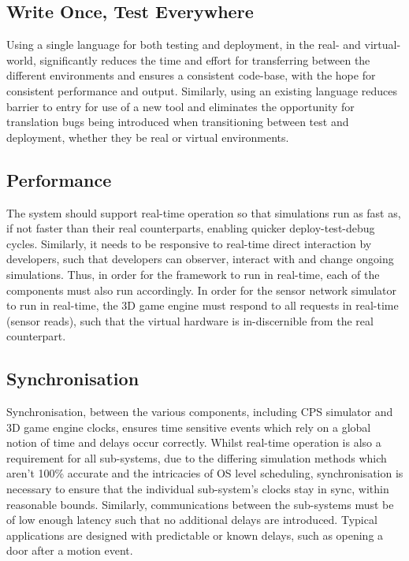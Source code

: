 \subsection{Write Once, Test Everywhere}
\label{sub:requirements_real_code}
Using a single language for both testing and deployment, in the real- and virtual-world, significantly reduces the time and effort for transferring between the different environments and ensures a consistent code-base, with the hope for consistent performance and output. Similarly, using an existing language reduces barrier to entry for use of a new tool and eliminates the opportunity for translation bugs being introduced when transitioning between test and deployment, whether they be real or virtual environments.

\subsection{Performance}
\label{sub:requirements_real-time_operation}
The system should support real-time operation so that simulations run as fast as, if not faster than their real counterparts, enabling quicker deploy-test-debug cycles. Similarly, it needs to be responsive to real-time direct interaction by developers, such that developers can observer, interact with and change ongoing simulations. Thus, in order for the framework to run in real-time, each of the components must also run accordingly. In order for the sensor network simulator to run in real-time, the 3D game engine must respond to all requests in real-time (sensor reads), such that the virtual hardware is in-discernible from the real counterpart.

\subsection{Synchronisation}
\label{sub:requirements_synchronisation}
Synchronisation, between the various components, including CPS simulator and 3D game engine clocks, ensures time sensitive events which rely on a global notion of time and delays occur correctly. Whilst real-time operation is also a requirement for all sub-systems, due to the differing simulation methods which aren't 100\% accurate and the intricacies of OS level scheduling, synchronisation is necessary to ensure that the individual sub-system's clocks stay in sync, within reasonable bounds. Similarly, communications between the sub-systems must be of low enough latency such that no additional delays are introduced. Typical applications are designed with predictable or known delays, such as opening a door after a motion event.

